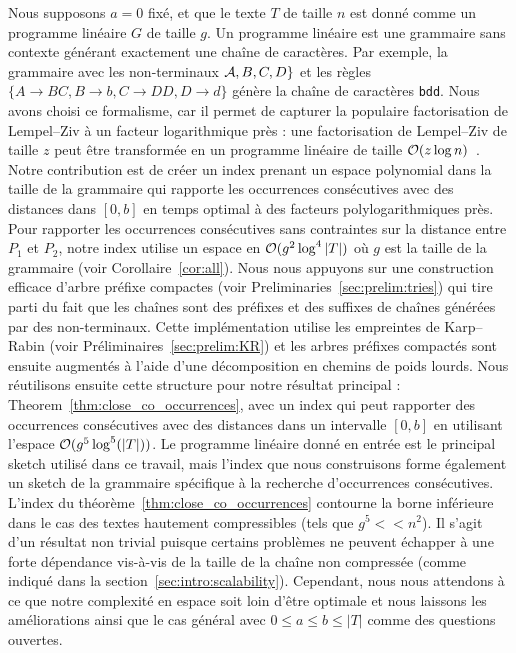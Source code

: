Nous supposons $a=0$ fixé, et que le texte $T$ de taille $n$ est donné comme un programme linéaire $G$ de taille $g$. Un programme linéaire est une grammaire sans contexte générant exactement une chaîne de caractères. Par exemple, la grammaire avec les non-terminaux $\mathcal{A},B,C,D\}$ et les règles $\{A \rightarrow BC, B \rightarrow b, C \rightarrow DD, D\rightarrow d \}$ génère la chaîne de caractères \texttt{bdd}.
Nous avons choisi ce formalisme, car il permet de capturer la populaire factorisation de Lempel--Ziv à un facteur logarithmique près : une factorisation de Lempel--Ziv de taille $z$ peut être transformée en un programme linéaire de taille $\mathcal{O}(z\log n)$~\cite{CharikarLLPPRSS02,Rytter02}.
%
Notre contribution est de créer un index prenant un espace polynomial dans la taille de la grammaire qui rapporte les occurrences consécutives avec des distances dans $[0,b]$ en temps optimal à des facteurs polylogarithmiques près.
Pour rapporter les occurrences consécutives sans contraintes sur la distance entre $P_1$ et $P_2$, notre index utilise un espace en $\mathcal{O}(g^2\log^4|T|)$ où $g$ est la taille de la grammaire (voir Corollaire~\ref{cor:all}).
%
Nous nous appuyons sur une construction efficace d'arbre préfixe compactes (voir Preliminaries~\ref{sec:prelim:tries}) qui tire parti du fait que les chaînes sont des préfixes et des suffixes de chaînes générées par des non-terminaux. Cette implémentation utilise les empreintes de Karp--Rabin (voir Préliminaires~\ref{sec:prelim:KR}) et les arbres préfixes compactés sont ensuite augmentés à l'aide d'une décomposition en chemins de poids lourds.
Nous réutilisons ensuite cette structure pour notre résultat principal : Theorem~\ref{thm:close_co_occurrences}, avec un index qui peut rapporter des occurrences consécutives avec des distances dans un intervalle $[0,b]$ en utilisant l'espace $\mathcal{O} (g^5\log^5(|T|))$.
%
Le programme linéaire donné en entrée est le principal sketch utilisé dans ce travail, mais l'index que nous construisons forme également un sketch de la grammaire spécifique à la recherche d'occurrences consécutives.
%
L'index du théorème~\ref{thm:close_co_occurrences} contourne la borne inférieure dans le cas des textes hautement compressibles (tels que $g^5 << n^2$). Il s'agit d'un résultat non trivial puisque certains problèmes ne peuvent échapper à une forte dépendance vis-à-vis de la taille de la chaîne non compressée (comme indiqué dans la section~\ref{sec:intro:scalability}). Cependant, nous nous attendons à ce que notre complexité en espace soit loin d'être optimale et nous laissons les améliorations ainsi que le cas général avec $0 \leq a \leq b \leq |T|$ comme des questions ouvertes.


